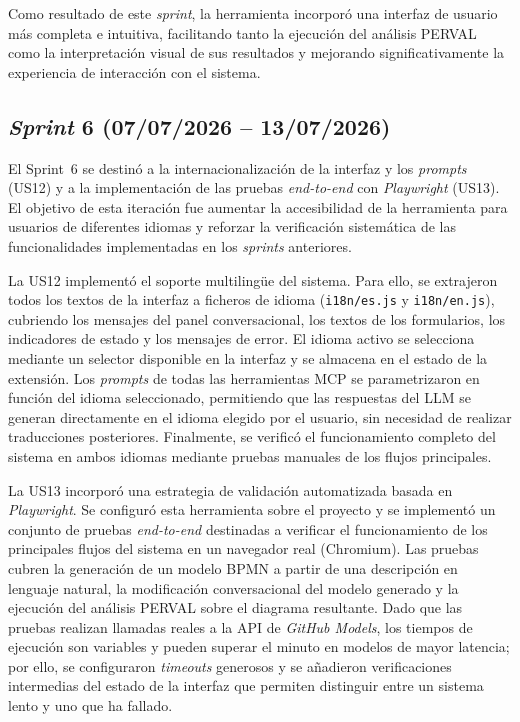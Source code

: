 Como resultado de este \textit{sprint}, la herramienta incorporó una interfaz de usuario más completa e intuitiva, facilitando tanto la ejecución del análisis PERVAL como la interpretación visual de sus resultados y mejorando significativamente la experiencia de interacción con el sistema.

\subsection{\textit{Sprint} 6 (07/07/2026 -- 13/07/2026)}
\label{subsec:sprint6}

El Sprint~6 se destinó a la internacionalización de la interfaz y los \textit{prompts} (US12) y a la implementación de las pruebas \textit{end-to-end} con \textit{Playwright} (US13). El objetivo de esta iteración fue aumentar la accesibilidad de la herramienta para usuarios de diferentes idiomas y reforzar la verificación sistemática de las funcionalidades implementadas en los \textit{sprints} anteriores.

La US12 implementó el soporte multilingüe del sistema. Para ello, se extrajeron todos los textos de la interfaz a ficheros de idioma (\texttt{i18n/es.js} y \texttt{i18n/en.js}), cubriendo los mensajes del panel conversacional, los textos de los formularios, los indicadores de estado y los mensajes de error. El idioma activo se selecciona mediante un selector disponible en la interfaz y se almacena en el estado de la extensión. Los \textit{prompts} de todas las herramientas MCP se parametrizaron en función del idioma seleccionado, permitiendo que las respuestas del LLM se generan directamente en el idioma elegido por el usuario, sin necesidad de realizar traducciones posteriores. Finalmente, se verificó el funcionamiento completo del sistema en ambos idiomas mediante pruebas manuales de los flujos principales.

La US13 incorporó una estrategia de validación automatizada basada en \textit{Playwright}. Se configuró esta herramienta sobre el proyecto y se implementó un conjunto de pruebas \textit{end-to-end} destinadas a verificar el funcionamiento de los principales flujos del sistema en un navegador real (Chromium). Las pruebas cubren la generación de un modelo BPMN a partir de una descripción en lenguaje natural, la modificación conversacional del modelo generado y la ejecución del análisis PERVAL sobre el diagrama resultante. Dado que las pruebas realizan llamadas reales a la API de \textit{GitHub Models}, los tiempos de ejecución son variables y pueden superar el minuto en modelos de mayor latencia; por ello, se configuraron \textit{timeouts} generosos y se añadieron verificaciones intermedias del estado de la interfaz que permiten distinguir entre un sistema lento y uno que ha fallado.

